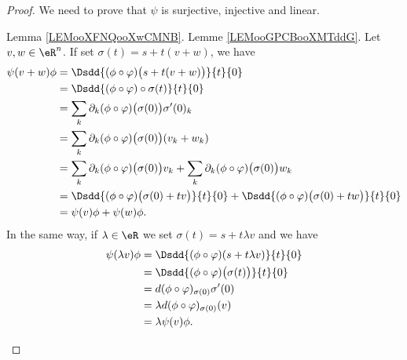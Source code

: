 \begin{proof}
	We need to prove that \( \psi\) is surjective, injective and linear.
	\begin{subproof}
		\spitem[Surjective] Lemma \ref{LEMooXFNQooXwCMNB}.
		\spitem[Injective] Lemme \ref{LEMooGPCBooXMTddG}.
		\spitem[Linear]
		Let \( v,w\in \eR^n\). If set \( \sigma(t)=s+t(v+w)\), we have
		\begin{subequations}
			\begin{align}
				\psi(v+w)\phi & =\Dsdd{ (\phi\circ \varphi)\big( s+t(v+w) \big) }{t}{0}                                                                \\
				              & =\Dsdd{ (\phi\circ \varphi)\circ \sigma(t) }{t}{0}                                                                     \\
				              & =\sum_k\partial_k(\phi\circ\varphi)\big( \sigma(0) \big)\sigma'(0)_k                                                   \\
				              & =\sum_k\partial_k(\phi\circ\varphi)\big( \sigma(0) \big)(v_k+w_k)                                                      \\
				              & =\sum_k\partial_k(\phi\circ\varphi)\big( \sigma(0) \big)v_k+\sum_k\partial_k(\phi\circ\varphi)\big( \sigma(0) \big)w_k \\
				              & =\Dsdd{ (\phi\circ\varphi)\big( \sigma(0)+tv \big) }{t}{0}+\Dsdd{ (\phi\circ\varphi)\big( \sigma(0)+tw \big) }{t}{0}   \\
				              & =\psi(v)\phi+\psi(w)\phi.
			\end{align}
		\end{subequations}
		In the same way, if \( \lambda\in \eR\) we set \( \sigma(t)=s+t\lambda v\) and we have
		\begin{subequations}
			\begin{align}
				\psi(\lambda v)\phi & =\Dsdd{ (\phi\circ\varphi)(s+t\lambda v) }{t}{0}        \\
				                    & =\Dsdd{ (\phi\circ\varphi)\big( \sigma(t) \big) }{t}{0} \\
				                    & =d(\phi\circ\varphi)_{\sigma(0)}\sigma'(0)              \\
				                    & =\lambda d(\phi\circ\varphi)_{\sigma(0)}(v)             \\
				                    & =\lambda\psi(v)\phi.
			\end{align}
		\end{subequations}
	\end{subproof}
\end{proof}


